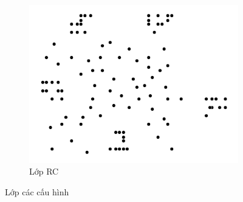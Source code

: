 \begin{figure}[H]
\begin{subfigure}{.3\textwidth}
		\includegraphics[width=1\linewidth]{figures/cls_rc.png}
		\caption{Lớp RC}
		\label{fig:cls_rc}
	\end{subfigure}
	\caption{Lớp các cấu hình}
\end{figure}

